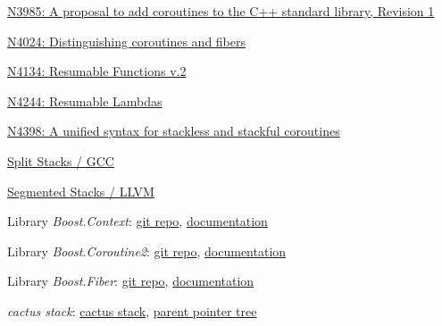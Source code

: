 \newpage
{}
\begin{thebibliography}{99}

        \href{http://www.open-std.org/jtc1/sc22/wg21/docs/papers/2014/n3985.pdf}
        {N3985: A proposal to add coroutines to the C++ standard library, Revision 1}

        \href{http://www.open-std.org/jtc1/sc22/wg21/docs/papers/2014/n4024.pdf}
        {N4024: Distinguishing coroutines and fibers}

        \href{http://www.open-std.org/jtc1/sc22/wg21/docs/papers/2014/n4134.pdf}
        {N4134: Resumable Functions v.2}

        \href{http://www.open-std.org/jtc1/sc22/wg21/docs/papers/2014/n4244.pdf}
        {N4244: Resumable Lambdas}

        \href{http://www.open-std.org/jtc1/sc22/wg21/docs/papers/2015/n4398.pdf}
        {N4398: A unified syntax for stackless and stackful coroutines}

        \href{http://gcc.gnu.org/wiki/SplitStacks}
        {Split Stacks / GCC}

        \href{http://llvm.org/releases/3.0/docs/SegmentedStacks.html}
        {Segmented Stacks / LLVM}

        Library \emph{Boost.Context}:
        \href{https://github.com/boostorg/context} {git repo},
        \href{http://www.boost.org/doc/libs/1_58_0/libs/context/doc/html/index.html} {documentation}

        Library \emph{Boost.Coroutine2}:
        \href{https://github.com/boostorg/coroutine2} {git repo},
        \href{http://olk.github.io/libs/coroutine2/doc/html/index.html} {documentation}

        Library \emph{Boost.Fiber}:
        \href{https://github.com/olk/boost-fiber} {git repo},
        \href{http://olk.github.io/libs/fiber/doc/html/index.html} {documentation}

        \emph{cactus stack}:
        \href{http://c2.com/cgi/wiki?CactusStack} {cactus stack},
        \href{http://en.wikipedia.org/wiki/Parent_pointer_tree} {parent pointer tree}

\end{thebibliography}
